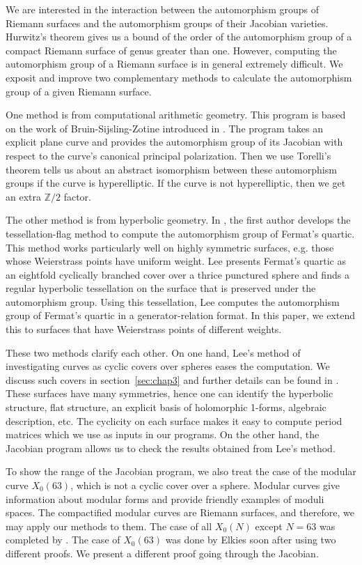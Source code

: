 \documentclass[12pt,reqno]{amsart}
\newcommand{\Z}{\mathbb{Z}}
\theoremstyle{definition}
\theoremstyle{remark}
\begin{document}
We are interested in the interaction between the automorphism groups of Riemann surfaces and the automorphism groups of their Jacobian varieties. Hurwitz's theorem gives us a bound of the order of the automorphism group of a compact Riemann surface of genus greater than one. However, computing the automorphism group of a Riemann surface is in general extremely difficult. We exposit and improve two complementary methods to calculate the automorphism group of a given Riemann surface.

One method is from computational arithmetic geometry. This program is based on the work of Bruin-Sijsling-Zotine introduced in \cite{jeroen}. The program takes an explicit plane curve and provides the automorphism group of its Jacobian with respect to the curve's canonical principal polarization. Then we use Torelli's theorem tells us about an abstract isomorphism between these automorphism groups if the curve is hyperelliptic. If the curve is not hyperelliptic, then we get an extra $\Z/2$ factor. %

The other method is from hyperbolic geometry. In \cite{dami}, the first author develops the tessellation-flag method to compute the automorphism group of Fermat's quartic. This method works particularly well on highly symmetric surfaces, e.g. those whose Weierstrass points have uniform weight. Lee presents Fermat's quartic as an eightfold cyclically branched cover over a thrice punctured sphere and finds a regular hyperbolic tessellation on the surface that is preserved under the automorphism group. Using this tessellation, Lee computes the automorphism group of Fermat's quartic in a generator-relation format. In this paper, we extend this to surfaces that have Weierstrass points of different weights. 

These two methods clarify each other. On one hand, Lee's method of investigating curves as cyclic covers over spheres eases the computation. We discuss such covers in section~\ref{sec:chap3} and further details can be found in \cite{dthesis}. These surfaces have many symmetries, hence one can identify the hyperbolic structure, flat structure, an explicit basis of holomorphic 1-forms, algebraic description, etc. The cyclicity on each surface makes it easy to compute period matrices which we use as inputs in our programs. On the other hand, the Jacobian program allows us to check the results obtained from Lee's method. 

To show the range of the Jacobian program, we also treat the case of the modular curve $X_0(63)$, which is not a cyclic cover over a sphere. Modular curves give information about modular forms and provide friendly examples of moduli spaces. The compactified modular curves are Riemann surfaces, and therefore, we may apply our methods to them. The case of all $X_0(N)$ except $N = 63$ was completed by \cite{km}. The case of $X_0(63)$ was done by Elkies soon after using two different proofs. We present a different proof going through the Jacobian.
\end{document}

